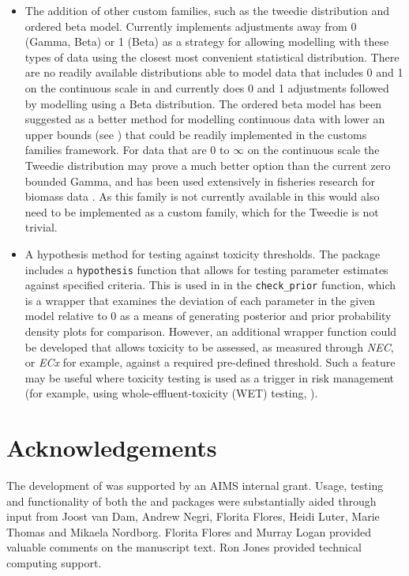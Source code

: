 \documentclass[
]{jss}
\begin{document}
\begin{itemize}
\item
  The addition of other custom families, such as the tweedie
  distribution and ordered beta model. Currently 
  implements adjustments away from 0 (Gamma, Beta) or 1 (Beta) as a
  strategy for allowing modelling with these types of data using the
  closest most convenient statistical distribution. There are no readily
  available distributions able to model data that includes 0 and 1 on
  the continuous scale in  and  currently does 0
  and 1 adjustments followed by modelling using a Beta distribution. The
  ordered beta model has been suggested as a better method for modelling
  continuous data with lower an upper bounds (see \citep{Kubinec}) that
  could be readily implemented in the  customs families
  framework. For data that are 0 to \(\infty\) on the continuous scale
  the Tweedie distribution may prove a much better option than the
  current zero bounded Gamma, and has been used extensively in fisheries
  research for biomass data \citep{Shono2008}. As this family is not
  currently available in  this would also need to be
  implemented as a custom family, which for the Tweedie is not trivial.
\item
  A hypothesis method for testing against toxicity thresholds. The
   package includes a \texttt{hypothesis} function that allows
  for testing parameter estimates against specified criteria. This is
  used in  in the \texttt{check\_prior} function, which is
  a wrapper that examines the deviation of each parameter in the given
  model relative to 0 as a means of generating posterior and prior
  probability density plots for comparison. However, an additional
  wrapper function could be developed that allows toxicity to be
  assessed, as measured through \emph{NEC}, or \emph{ECx} for example,
  against a required pre-defined threshold. Such a feature may be useful
  where toxicity testing is used as a trigger in risk management (for
  example, using whole-effluent-toxicity (WET) testing,
  \citep{Karman2019}).
\end{itemize}

\hypertarget{acknowledgements}{%
\section{Acknowledgements}\label{acknowledgements}}

The development of  was supported by an AIMS internal
grant. Usage, testing and functionality of both the  and
 packages were substantially aided through input from
Joost van Dam, Andrew Negri, Florita Flores, Heidi Luter, Marie Thomas
and Mikaela Nordborg. Florita Flores and Murray Logan provided valuable
comments on the manuscript text. Ron Jones provided technical computing
support.

\renewcommand\refname{References}

\end{document}
